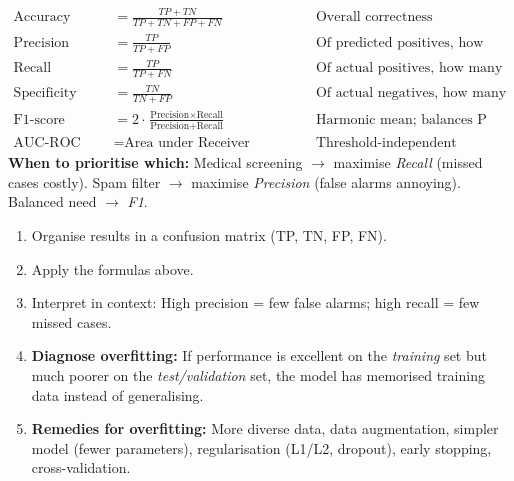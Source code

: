 \documentclass[11pt]{article}
\begin{document}
\begin{aretenir}
\begin{align*}
\text{Accuracy} &= \frac{TP + TN}{TP + TN + FP + FN} && \text{Overall correctness} \\
\text{Precision} &= \frac{TP}{TP + FP} && \text{Of predicted positives, how many are truly positive? (avoid false alarms)} \\
\text{Recall (Sensitivity)} &= \frac{TP}{TP + FN} && \text{Of actual positives, how many did we find? (avoid missed cases)} \\
\text{Specificity} &= \frac{TN}{TN + FP} && \text{Of actual negatives, how many correctly rejected?} \\
\text{F1-score} &= 2 \cdot \frac{\text{Precision} \times \text{Recall}}{\text{Precision} + \text{Recall}} && \text{Harmonic mean; balances P \& R} \\
\text{AUC-ROC} &= \text{Area under Receiver Operating Characteristic curve} && \text{Threshold-independent ranking quality}
\end{align*}
\textbf{When to prioritise which:} Medical screening $\rightarrow$ maximise \emph{Recall} (missed cases costly). Spam filter $\rightarrow$ maximise \emph{Precision} (false alarms annoying). Balanced need $\rightarrow$ \emph{F1}.
\end{aretenir}

\begin{methode}
\begin{enumerate}
\item Organise results in a confusion matrix (TP, TN, FP, FN).
\item Apply the formulas above.
\item Interpret in context: High precision = few false alarms; high recall = few missed cases.
\item \textbf{Diagnose overfitting:} If performance is excellent on the \emph{training} set but much poorer on the \emph{test/validation} set, the model has memorised training data instead of generalising.
\item \textbf{Remedies for overfitting:} More diverse data, data augmentation, simpler model (fewer parameters), regularisation (L1/L2, dropout), early stopping, cross-validation.
\end{enumerate}
\end{methode}
\end{document}
